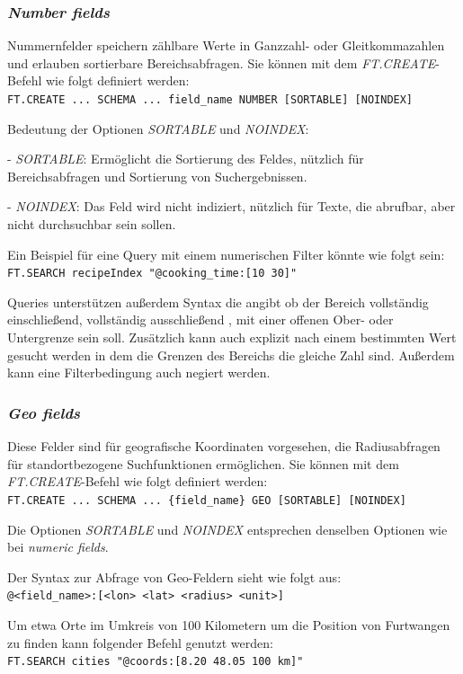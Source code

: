 \subsubsection{\emph{Number fields}}
Nummernfelder speichern zählbare Werte in Ganzzahl- oder Gleitkommazahlen und erlauben sortierbare Bereichsabfragen. Sie können mit dem \emph{FT.CREATE}-Befehl wie folgt definiert werden:\\
\texttt{FT.CREATE ... SCHEMA ... {field\_name} NUMBER [SORTABLE] [NOINDEX]}

Bedeutung der Optionen \emph{SORTABLE} und \emph{NOINDEX}:

- \emph{SORTABLE}: Ermöglicht die Sortierung des Feldes, nützlich für Bereichsabfragen und Sortierung von Suchergebnissen.

- \emph{NOINDEX}: Das Feld wird nicht indiziert, nützlich für Texte, die abrufbar, aber nicht durchsuchbar sein sollen.

Ein Beispiel für eine Query mit einem numerischen Filter könnte wie folgt sein:\\
\texttt{FT.SEARCH recipeIndex "@cooking\_time:[10 30]"}

Queries unterstützen außerdem Syntax die angibt ob der Bereich vollständig einschließend, vollständig ausschließend , mit einer offenen Ober- oder Untergrenze sein soll. Zusätzlich kann auch explizit nach einem bestimmten Wert gesucht werden in dem die Grenzen des Bereichs die gleiche Zahl sind. Außerdem kann eine Filterbedingung auch negiert werden.

\subsubsection{\emph{Geo fields}} Diese Felder sind für geografische Koordinaten vorgesehen, die Radiusabfragen für standortbezogene Suchfunktionen ermöglichen.
Sie können mit dem \emph{FT.CREATE}-Befehl wie folgt definiert werden:\\
\texttt{FT.CREATE ... SCHEMA ... \{field\_name\} GEO [SORTABLE] [NOINDEX]}

Die Optionen \emph{SORTABLE} und \emph{NOINDEX} entsprechen denselben Optionen wie bei \emph{numeric fields}. 

Der Syntax zur Abfrage von Geo-Feldern sieht wie folgt aus:\\
\texttt{@<field\_name>:[<lon> <lat> <radius> <unit>]}

Um etwa Orte im Umkreis von 100 Kilometern um die Position von Furtwangen zu finden kann folgender Befehl genutzt werden:\\
\texttt{FT.SEARCH cities "@coords:[8.20 48.05 100 km]"}

